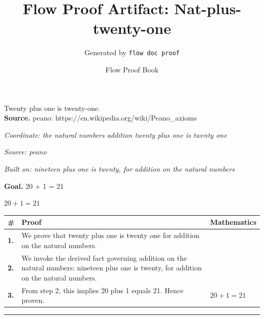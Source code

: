 \documentclass[11pt]{article}
\title{Flow Proof Artifact: Nat-plus-twenty-one}
\author{Generated by \texttt{flow doc proof}}
\date{Flow Proof Book}
\theoremstyle{definition}
\begin{document}
\maketitle
Twenty plus one is twenty-one.\\[0.5em]
\textbf{Source.} peano: https://en.wikipedia.org/wiki/Peano\_axioms\\[0.5em]
\bigskip
{}\par
\smallskip\noindent\textit{Coordinate: the natural numbers \cdot addition \cdot twenty plus one is twenty one}\par
\smallskip\noindent\textit{Source: peano}\par
\smallskip\noindent\textit{Built on: nineteen plus one is twenty, for addition on the natural numbers}\par
\medskip
\noindent\textbf{Goal.} 20 + 1 = 21\par
\noindent$\displaystyle 20 + 1 = 21$\par
\medskip
\noindent
\begin{tabular}{@{} >{\raggedright\arraybackslash}p{} >{\raggedright\arraybackslash}p{} >{\raggedleft\arraybackslash}p{} @{}}
\textbf{\#} & \textbf{Proof} & \textbf{Mathematics} \\
\midrule
\textbf{1.} & We prove that twenty plus one is twenty one for addition on the natural numbers. & \\[0.45em]
\textbf{2.} & We invoke the derived fact governing addition on the natural numbers: nineteen plus one is twenty, for addition on the natural numbers. & \\[0.45em]
\textbf{3.} & From step 2, this implies 20 plus 1 equals 21. Hence proven. & $\displaystyle 20 + 1 = 21$ \\[0.45em]
\bottomrule
\end{tabular}
\label{thm:Nat-addition-twenty_plus_one_is_twenty_one}
\par\medskip\hrule
\end{document}
